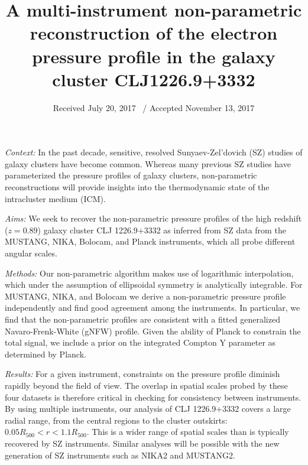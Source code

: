 \documentclass[onecolumn,traditabstract]{aa}
\begin{document}
\title{A multi-instrument non-parametric reconstruction of the electron pressure profile in the
  galaxy cluster CLJ1226.9+3332}


\date{Received July 20, 2017 \ / Accepted November 13, 2017}



\abstract
    {\emph{Context:} In the past decade, sensitive, resolved Sunyaev-Zel'dovich (SZ) studies of galaxy
      clusters have become common. Whereas many previous SZ studies have parameterized the pressure
      profiles of galaxy clusters, non-parametric reconstructions will provide insights
      into the thermodynamic state of the intracluster medium (ICM).
      
      \emph{Aims:} We seek to recover the non-parametric pressure profiles of the high redshift ($z=0.89$)
      galaxy cluster CLJ 1226.9+3332 as inferred from SZ data
      from the MUSTANG, NIKA, Bolocam, and Planck instruments, which all probe different angular scales.
     
      \emph{Methods:} Our non-parametric algorithm makes use of logarithmic interpolation,
      which under the assumption of ellipsoidal symmetry is analytically integrable.
      For MUSTANG, NIKA, and Bolocam we derive a non-parametric pressure profile 
      independently and find good agreement among the instruments. In particular, we find
      that the non-parametric profiles are consistent with a fitted generalized Navaro-Frenk-White (gNFW)
      profile. Given the ability of Planck to constrain the total signal,
      we include a prior on the integrated Compton Y parameter as determined by Planck.
      
      \emph{Results:}
      For a given instrument, constraints on the pressure profile diminish rapidly beyond the
      field of view. The overlap in spatial scales probed by these four datasets is
      therefore critical in checking for consistency between instruments.
      By using multiple instruments, our analysis of CLJ 1226.9+3332 
      covers a large radial range, from the central regions to the cluster outskirts:
      $0.05 R_{500} < r < 1.1 R_{500}$. This is a wider range of spatial scales
      than is typically recovered by SZ instruments.
      Similar analyses will be possible with the new generation
      of SZ instruments such as NIKA2 and MUSTANG2.}
\end{document}
